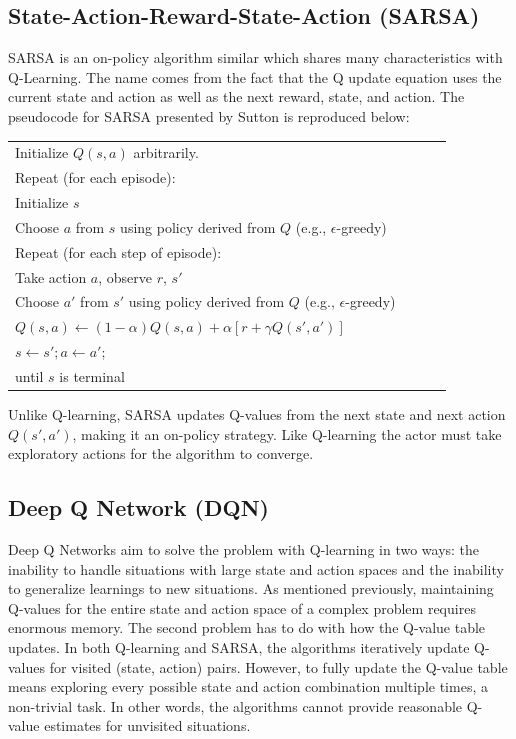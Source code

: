 \subsection{State-Action-Reward-State-Action (SARSA)}
SARSA is an on-policy algorithm similar which shares many characteristics with Q-Learning. The name comes from the fact that the Q update equation uses the current state and action as well as the next reward, state, and action. The pseudocode for SARSA presented by Sutton is reproduced below:
\begin{center} \begin{tabular}{|p{0.9\linewidth}|}\hline %
Initialize $Q(s,a)$ arbitrarily. \\
Repeat (for each episode): \\
\qquad Initialize $s$\\
\qquad Choose $a$ from $s$ using policy derived from $Q$ (e.g., $\epsilon$-greedy)\\
\qquad Repeat (for each step of episode):\\
\qquad \qquad Take action $a$, observe $r$, $s'$\\
\qquad \qquad Choose $a'$ from $s'$ using policy derived from $Q$ (e.g., $\epsilon$-greedy)\\
\qquad \qquad $	Q(s,a)\gets (1-\alpha)Q(s,a) + \alpha [r + \gamma Q(s',a')]$\\
\qquad \qquad $s \gets s'; a \gets a'$;\\
\qquad until $s$ is terminal \\
\hline
\end{tabular} \end{center}
Unlike Q-learning, SARSA updates Q-values from the next state and next action $Q(s',a')$, making it an on-policy strategy. Like Q-learning the actor must take exploratory actions for the algorithm to converge.

\subsection{Deep Q Network (DQN)}
Deep Q Networks aim to solve the problem with Q-learning in two ways: the inability to handle situations with large state and action spaces and the inability to generalize learnings to new situations. As mentioned previously, maintaining Q-values for the entire state and action space of a complex problem requires enormous memory. The second problem has to do with how the Q-value table updates. In both Q-learning and SARSA, the algorithms iteratively update Q-values for visited (state, action) pairs. However, to fully update the Q-value table means exploring every possible state and action combination multiple times, a non-trivial task. In other words, the algorithms cannot provide reasonable Q-value estimates for unvisited situations.

